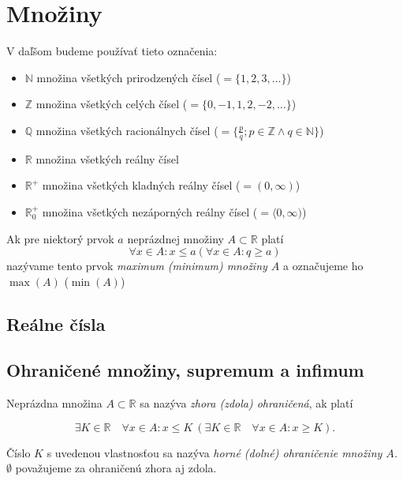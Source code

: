 \chapter{Množiny}

V daľšom budeme používať tieto označenia:
\begin{itemize}[label=]
  \item $\mathbb{N}$ množina všetkých prirodzených čísel ($= \{ 1, 2, 3, \ldots \}$)
  \item $\mathbb{Z}$ množina všetkých celých čísel ($= \{ 0, -1, 1, 2, -2, \ldots \}$)
  \item $\mathbb{Q}$ množina všetkých racionálnych čísel
    ($= \{ \frac{p}{q}; p \in \mathbb{Z} \land q \in \mathbb{N} \}$)
  \item $\mathbb{R}$ množina všetkých reálny čísel
  \item $\mathbb{R}^+$ množina všetkých kladných reálny čísel ($= ( 0, \infty )$)
  \item $\mathbb{R}^+_0$ množina všetkých nezáporných reálny čísel
    ($= \langle 0, \infty )$)
\end{itemize}
Ak pre niektorý prvok $a$ neprázdnej množiny $A \subset \mathbb{R}$ platí
\[
  \forall x \in A : x \leq a (\forall x \in A: q \geq a)
\]
nazývame tento prvok \emph{maximum (minimum) množiny $A$} a označujeme ho
$\max(A)$ ($\min(A)$)

\section{Reálne čísla}

\begin{enumerate}[resume]
\end{enumerate}

\section{Ohraničené množiny, supremum a infimum}

Neprázdna množina $A \subset \mathbb{R}$ sa nazýva \textit{zhora (zdola)
ohraničená}, ak platí

$$
\exists K \in  \mathbb{R} \quad \forall x \in A: x \leq K \:
(\exists K \in \mathbb{R} \quad \forall x \in A: x \geq K).
$$

Číslo $K$ s uvedenou vlastnosťou sa nazýva \textit{horné (dolné)
ohraničenie množiny $A$.} $\emptyset$ považujeme za ohraničenú zhora aj zdola.


